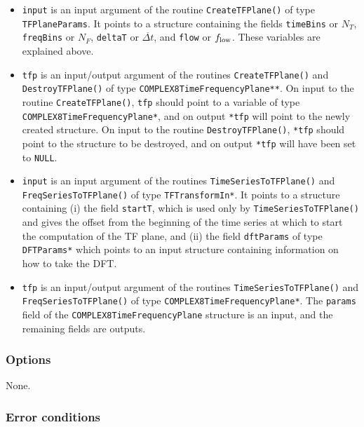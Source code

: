 \documentclass{article}
\begin{document}
\begin{itemize}
\item \texttt{input} is an input argument of the routine
\verb+CreateTFPlane()+ of type \verb+TFPlaneParams+.  It points to a
structure containing the fields \verb+timeBins+ or $N_T$,
\verb+freqBins+ or $N_F$, \verb+deltaT+ or ${\overline {\Delta t}}$,
and \verb+flow+ or $f_{\rm low}$.  These variables are explained
above.

\item \texttt{tfp} is an input/output argument of the routines
\verb+CreateTFPlane()+ and \verb+DestroyTFPlane()+ of type 
\verb+COMPLEX8TimeFrequencyPlane**+.  On input to the routine
\verb+CreateTFPlane()+, \verb+tfp+ should point to a variable of type 
\verb+COMPLEX8TimeFrequencyPlane*+, and on output \verb+*tfp+ will
point to the newly created structure.  On input to the routine 
\verb+DestroyTFPlane()+, \verb+*tfp+ should point to the structure to
be destroyed, and on output \verb+*tfp+ will have been set to \verb+NULL+.

\item \texttt{input} is an input argument of the routines
\verb+TimeSeriesToTFPlane()+ and \verb+FreqSeriesToTFPlane()+ of type
\verb+TFTransformIn*+.  It points to a structure containing (i) the field
\verb+startT+, which is used only by \verb+TimeSeriesToTFPlane()+ 
and gives the offset from the beginning of the time series at which
to start the computation of the TF plane, and (ii) the field
\verb+dftParams+ of type \verb+DFTParams*+ which points to an input
structure containing information on how to take the DFT.  

\item \texttt{tfp} is an input/output argument of the routines
\verb+TimeSeriesToTFPlane()+ and \verb+FreqSeriesToTFPlane()+ of type 
\verb+COMPLEX8TimeFrequencyPlane*+.  The \verb+params+ field of the
\verb+COMPLEX8TimeFrequencyPlane+ structure is an input, and the
remaining fields are outputs. 



\end{itemize}

\subsubsection{Options}

None. 

\subsubsection{Error conditions}
\end{document}
